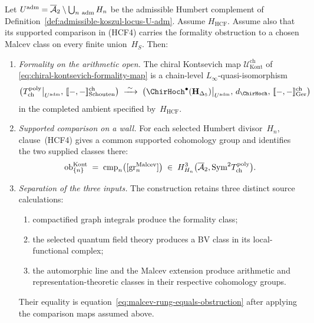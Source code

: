 \begin{theorem}
\label{thm:chiral-kontsevich-formality-unified}
\ClaimStatusConditional
{}%
%
Let $U^{\mathrm{adm}}=\overline{\mathcal A}_2\setminus
\bigcup_{n\ \mathrm{adm}}H_n$ be the admissible Humbert complement of
Definition~\ref{def:admissible-koszul-locus-U-adm}.  Assume
$H_{\mathrm{HCF}}$.  Assume also that its supported comparison in
\textup{(HCF4)} carries the formality obstruction to a chosen Malcev
class on every finite union~$H_S$.  Then:
\begin{enumerate}[label=\textup{(\alph*)}]
\item \emph{Formality on the arithmetic open.}
The chiral Kontsevich map
$\mathcal U^{\mathrm{ch}}_{\mathrm{Kont}}$ of
\eqref{eq:chiral-kontsevich-formality-map} is a chain-level
$L_\infty$-quasi-isomorphism
\[
\bigl(\Tpolych\big|_{\Uadm},\,
[\![-,-]\!]_{\mathrm{Schouten}}^{\mathrm{ch}}\bigr)
\;\xrightarrow{\;\sim\;}\;
\bigl(\ChirHoch^\bullet(\mathbf H_{\Delta_5})\big|_{\Uadm},\,
d_{\ChirHoch},\,[\![-,-]\!]_{\mathrm{Ger}}^{\mathrm{ch}}\bigr)
\]
in the completed ambient specified by~$H_{\mathrm{HCF}}$.
\item \emph{Supported comparison on a wall.}  For each selected
Humbert divisor~$H_n$, clause~\textup{(HCF4)} gives a common supported
cohomology group and identifies the two supplied classes there:
\begin{equation}
\label{eq:malcev-rung-equals-obstruction}
\mathrm{ob}^{\mathrm{Kont}}_{\{n\}}
\;=\;
\operatorname{cmp}_n
\bigl([\mathrm{gr}_n^{\mathrm{Malcev}}]\bigr)
\;\in\;
H^3_{H_n}\bigl(\overline{\mathcal A}_2,
\mathrm{Sym}^2T^{\mathrm{poly}}_{\mathrm{ch}}\bigr).
\end{equation}
\item \emph{Separation of the three inputs.}  The construction retains
three distinct source calculations:
\begin{enumerate}[label=\textup{(\roman*)}]
\item compactified graph integrals produce the formality class;
\item the selected quantum field theory produces a BV class in its
local-functional complex;
\item the automorphic line and the Malcev extension produce arithmetic
and representation-theoretic classes in their respective cohomology
groups.
\end{enumerate}
Their equality is equation~\eqref{eq:malcev-rung-equals-obstruction}
after applying the comparison maps assumed above.
\end{enumerate}
\end{theorem}

